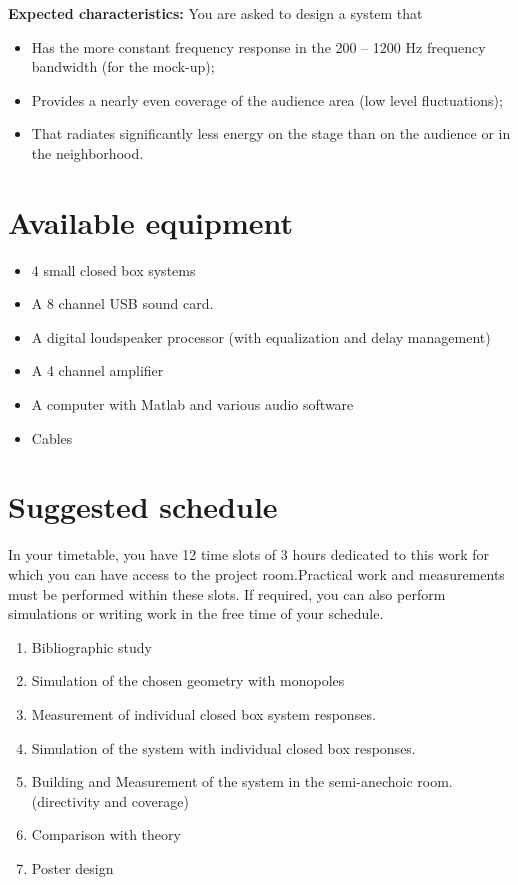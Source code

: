 \documentclass[a4paper, 12pt]{article}
\begin{document}
\textbf{Expected characteristics:} You are asked to design a system that
\begin{itemize}
	\item Has the more constant frequency response in the 200 -- 1200 Hz frequency bandwidth (for the mock-up);
	\item Provides a nearly even coverage of the audience area (low level fluctuations);
	\item That radiates significantly less energy on the stage than on the audience or in the neighborhood.
\end{itemize}

\section{Available equipment}
\begin{itemize}
	\item 4 small closed box systems
	\item A 8 channel USB sound card.
	\item A digital loudspeaker processor (with equalization and delay management)
	\item A 4 channel amplifier
	\item A computer with Matlab and various audio software
	\item Cables
\end{itemize}

\section{Suggested schedule}

In your timetable, you have 12 time slots of 3 hours dedicated to this work
for which you can have access to the project room.Practical work and
measurements must be performed within these slots. If required, you can
also perform simulations or writing work in the free time of your schedule.

\begin{enumerate}
	\item Bibliographic study
	\item Simulation of the chosen geometry with monopoles
	\item Measurement of individual closed box system responses.
	\item Simulation of the system with individual closed box responses.
	\item Building and Measurement of the system in the semi-anechoic room.  (directivity and coverage)
	\item Comparison with theory
	\item Poster design
\end{enumerate}
\end{document}
